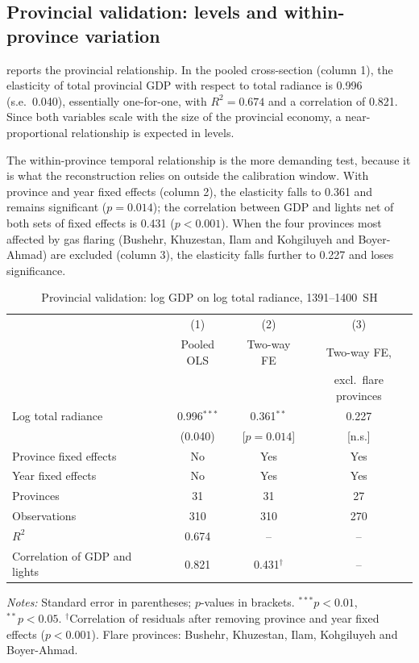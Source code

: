 \documentclass[11pt,a4paper]{article}
\begin{document}
\subsection{Provincial validation: levels and within-province variation}\label{sec:prelimprov}

 reports the provincial relationship. In the pooled cross-section (column 1), the elasticity of total provincial GDP with respect to total radiance is 0.996 (s.e.\ 0.040), essentially one-for-one, with $R^2=0.674$ and a correlation of 0.821. Since both variables scale with the size of the provincial economy, a near-proportional relationship is expected in levels.

The within-province temporal relationship is the more demanding test, because it is what the reconstruction relies on outside the calibration window. With province and year fixed effects (column 2), the elasticity falls to 0.361 and remains significant ($p=0.014$); the correlation between GDP and lights net of both sets of fixed effects is 0.431 ($p<0.001$). When the four provinces most affected by gas flaring (Bushehr, Khuzestan, Ilam and Kohgiluyeh and Boyer-Ahmad) are excluded (column 3), the elasticity falls further to 0.227 and loses significance.

\begin{table}[htbp]
\centering\small
\caption{Provincial validation: log GDP on log total radiance, 1391--1400~SH}
\label{tab:provincial}
\begin{threeparttable}
\begin{tabular}{@{}lccc@{}}
\toprule
 & (1) & (2) & (3)\\
 & Pooled OLS & Two-way FE & Two-way FE,\\
 &  &  & excl.\ flare provinces\\
\midrule
Log total radiance & 0.996$^{***}$ & 0.361$^{**}$ & 0.227\\
 & (0.040) & [$p=0.014$] & [n.s.]\\
\midrule
Province fixed effects & No & Yes & Yes\\
Year fixed effects & No & Yes & Yes\\
Provinces & 31 & 31 & 27\\
Observations & 310 & 310 & 270\\
$R^2$ & 0.674 & -- & --\\
Correlation of GDP and lights & 0.821 & 0.431$^{\dagger}$ & --\\
\bottomrule
\end{tabular}
\begin{tablenotes}\footnotesize
\item \emph{Notes:} Standard error in parentheses; $p$-values in brackets. $^{***}p<0.01$, $^{**}p<0.05$. $^{\dagger}$Correlation of residuals after removing province and year fixed effects ($p<0.001$). Flare provinces: Bushehr, Khuzestan, Ilam, Kohgiluyeh and Boyer-Ahmad.
\end{tablenotes}
\end{threeparttable}
\end{table}
\end{document}
